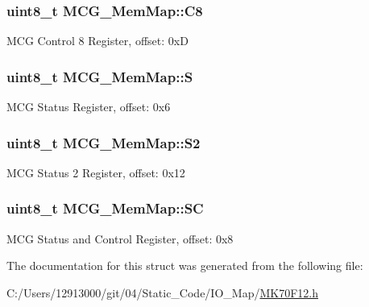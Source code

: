 \subsubsection[{C8}]{\setlength{\rightskip}{0pt plus 5cm}uint8\+\_\+t M\+C\+G\+\_\+\+Mem\+Map\+::\+C8}\label{struct_m_c_g___mem_map_a346a8b8c5c2c675e6297aaa1f14798df}
M\+C\+G Control 8 Register, offset\+: 0x\+D \hypertarget{struct_m_c_g___mem_map_a65ee0333e0d5c462c7dd8c2402bf93be}{}
\subsubsection[{S}]{\setlength{\rightskip}{0pt plus 5cm}uint8\+\_\+t M\+C\+G\+\_\+\+Mem\+Map\+::\+S}\label{struct_m_c_g___mem_map_a65ee0333e0d5c462c7dd8c2402bf93be}
M\+C\+G Status Register, offset\+: 0x6 \hypertarget{struct_m_c_g___mem_map_a97d548f46a8b3fa3cd094dbbd5e579af}{}
\subsubsection[{S2}]{\setlength{\rightskip}{0pt plus 5cm}uint8\+\_\+t M\+C\+G\+\_\+\+Mem\+Map\+::\+S2}\label{struct_m_c_g___mem_map_a97d548f46a8b3fa3cd094dbbd5e579af}
M\+C\+G Status 2 Register, offset\+: 0x12 \hypertarget{struct_m_c_g___mem_map_aeff584aa52340d7c66dc06789ad05310}{}
\subsubsection[{S\+C}]{\setlength{\rightskip}{0pt plus 5cm}uint8\+\_\+t M\+C\+G\+\_\+\+Mem\+Map\+::\+S\+C}\label{struct_m_c_g___mem_map_aeff584aa52340d7c66dc06789ad05310}
M\+C\+G Status and Control Register, offset\+: 0x8 

The documentation for this struct was generated from the following file\+:\begin{DoxyCompactItemize}
\item 
C\+:/\+Users/12913000/git/04/\+Static\+\_\+\+Code/\+I\+O\+\_\+\+Map/\hyperlink{_m_k70_f12_8h}{M\+K70\+F12.\+h}\end{DoxyCompactItemize}
